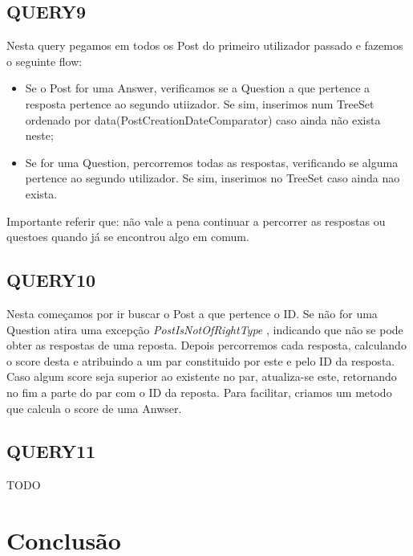 \subsection{QUERY9}

Nesta query pegamos em todos os Post do primeiro utilizador passado e fazemos o seguinte flow:
\begin{itemize}
    \item Se o Post for uma Answer, verificamos se a Question a que pertence a resposta pertence ao segundo utiizador. Se sim,
    inserimos num TreeSet ordenado por data(PostCreationDateComparator) caso ainda não exista neste;
    \item Se for uma Question, percorremos todas as respostas, verificando se alguma pertence ao segundo utilizador. Se sim, inserimos
    no TreeSet caso ainda nao exista.
\end{itemize}
    Importante referir que: não vale a pena continuar a percorrer as respostas ou questoes quando já se encontrou algo em comum.


\subsection{QUERY10}

Nesta começamos por ir buscar o Post a que pertence o ID. Se não for uma Question atira uma excepção \textit{PostIsNotOfRightType}
, indicando que não se pode obter as respostas de uma reposta.
Depois percorremos cada resposta, calculando o score desta e atribuindo a um par constituido por este e pelo ID da resposta.
Caso algum score seja superior ao existente no par, atualiza-se este, retornando no fim a parte do par com o ID da reposta.
Para facilitar, criamos um metodo que calcula o score de uma Anwser.

\subsection{QUERY11}

TODO

\section{Conclusão}

